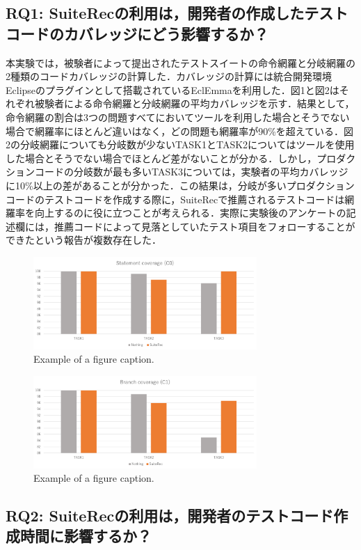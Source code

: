 \documentclass[conference]{IEEEtran}
\begin{document}
\subsection{RQ1: SuiteRecの利用は，開発者の作成したテストコードのカバレッジにどう影響するか？}
本実験では，被験者によって提出されたテストスイートの命令網羅と分岐網羅の2種類のコードカバレッジの計算した．カバレッジの計算には統合開発環境Eclipseのプラグインとして搭載されているEclEmmaを利用した．図1と図2はそれぞれ被験者による命令網羅と分岐網羅の平均カバレッジを示す．結果として，命令網羅の割合は3つの問題すべてにおいてツールを利用した場合とそうでない場合で網羅率にほとんど違いはなく，どの問題も網羅率が90\%を超えている．図2の分岐網羅についても分岐数が少ないTASK1とTASK2についてはツールを使用した場合とそうでない場合でほとんど差がないことが分かる．しかし，プロダクションコードの分岐数が最も多いTASK3については，実験者の平均カバレッジに10\%以上の差があることが分かった．この結果は，分岐が多いプロダクションコードのテストコードを作成する際に，SuiteRecで推薦されるテストコードは網羅率を向上するのに役に立つことが考えられる．実際に実験後のアンケートの記述欄には，推薦コードによって見落としていたテスト項目をフォローすることができたという報告が複数存在した．
\begin{figure}[htbp]
\centerline{\includegraphics[width=8.5cm]{C0.pdf}}
\caption{Example of a figure caption.}
\label{fig}
\end{figure}

\begin{figure}[htbp]
\centerline{\includegraphics[width=8.5cm]{C1.pdf}}
\caption{Example of a figure caption.}
\label{fig}
\end{figure}

\subsection{RQ2: SuiteRecの利用は，開発者のテストコード作成時間に影響するか？}
\end{document}
